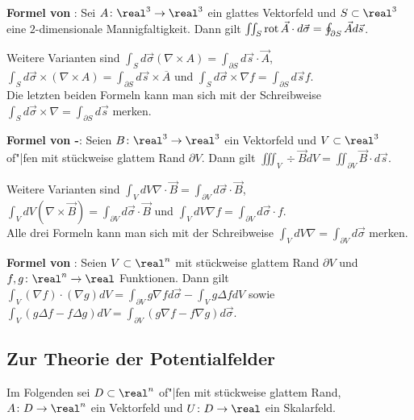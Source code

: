 \linie

\textbf{Formel von }:
Sei $A\colon \real^3 \rightarrow \real^3$ ein glattes Vektorfeld und
$S \subset \real^3$ eine $2$-dimensionale Mannigfaltigkeit.
Dann gilt $\iint_S \operatorname{rot} \vec{A} \cdot d\vec{\sigma} =
\oint_{\partial S} \vec{A} d\vec{s}$.

Weitere Varianten sind
$\int_S d\vec{\sigma} (\nabla \times A) =
\int_{\partial S} d\vec{s} \cdot \vec{A}$, \\
$\int_S d\vec{\sigma} \times (\nabla \times A) =
\int_{\partial S} d\vec{s} \times \overline{A}$ \quad und \quad
$\int_S d\vec{\sigma} \times \nabla f =
\int_{\partial S} d\vec{s} f$. \\
Die letzten beiden Formeln kann man sich mit der Schreibweise
$\int_S d\vec{\sigma} \times \nabla = \int_{\partial S} d\vec{s}$
merken.

\linie

\textbf{Formel von -}:
Seien $B\colon \real^3 \rightarrow \real^3$ ein Vektorfeld und
$V \subset \real^3$ of"|fen mit stückweise glattem Rand $\partial V$.
Dann gilt $\iiint_V \div \vec{B} dV =
\iint_{\partial V} \vec{B} \cdot d\vec{s}$.

Weitere Varianten sind
$\int_V dV \nabla \cdot \vec{B} =
\int_{\partial V} d\vec{\sigma} \cdot \vec{B}$, \\
$\int_V dV (\nabla \times \vec{B}) =
\int_{\partial V} d\vec{\sigma} \cdot \vec{B}$ \quad und \quad
$\int_V dV \nabla f = \int_{\partial V} d\vec{\sigma} \cdot f$. \\
Alle drei Formeln kann man sich mit der Schreibweise
$\int_V dV \nabla = \int_{\partial V} d\vec{\sigma}$ merken.

\linie

\textbf{Formel von }:
Seien $V \subset \real^n$ mit stückweise glattem Rand $\partial V$ und
$f, g\colon \real^n \rightarrow \real$ Funktionen.
Dann gilt $\int_V (\nabla f) \cdot (\nabla g) dV =
\int_{\partial V} g \nabla f d\vec{\sigma} - \int_V g \Delta f dV$ sowie \\
$\int_V (g \Delta f - f \Delta g) dV =
\int_{\partial V} (g \nabla f - f \nabla g) d\vec{\sigma}$.

\subsection{%
    Zur Theorie der Potentialfelder%
}

Im Folgenden sei $D \subset \real^n$ of"|fen mit stückweise glattem Rand,
$A\colon D \rightarrow \real^n$ ein Vektorfeld und
$U\colon D \rightarrow \real$ ein Skalarfeld.

